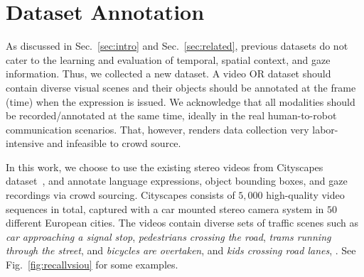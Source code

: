 \documentclass[10pt,twocolumn,letterpaper]{article}
\newcommand{\dengxincomment}[1]{\textcolor{blue}{\textit{#1}}}
\begin{document}






%



\section{Dataset Annotation}
\label{sec:dataset}

As discussed in Sec.~\ref{sec:intro} and Sec.~\ref{sec:related}, previous datasets do not cater to the learning and evaluation of temporal, spatial context, and gaze information.  Thus, we collected a new dataset.  A video OR dataset should contain  diverse visual scenes and their objects should be annotated at the frame (time) when the expression is issued. We acknowledge that all modalities should be recorded/annotated at the same time, ideally in the real human-to-robot communication scenarios. That, however, renders data collection very labor-intensive and infeasible to crowd source.  

In this work, we choose to use the existing stereo videos from Cityscapes dataset~\cite{cityscape}, and annotate language expressions, object bounding boxes, and gaze recordings via crowd sourcing. Cityscapes consists of $5,000$ high-quality video sequences in total, captured with a car mounted stereo camera system in $50$ different European cities.  The videos contain diverse sets of traffic scenes such as \emph{car approaching a signal stop}, \emph{pedestrians crossing the road}, \emph{trams running through the street}, and \emph{bicycles are overtaken}, and \emph{kids crossing  road lanes}, \etc. See Fig.~\ref{fig:recallvsiou} for some examples.

\end{document}
